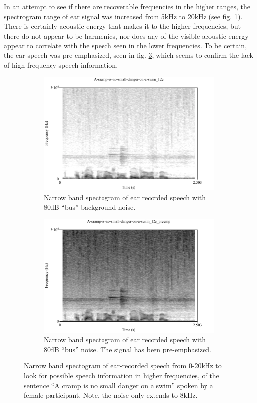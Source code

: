\documentclass[dissertation,copyright]{uathesis}
\begin{document}
In an attempt to see if there are recoverable frequencies in the higher ranges, the spectrogram range of ear signal was increased from 5kHz to 20kHz (see fig. \ref{spctgrmEarNarrow20kHz}). There is certainly acoustic energy that makes it to the higher frequencies, but there do not appear to be harmonics, nor does any of the visible acoustic energy appear to correlate with the speech seen in the lower frequencies.
To be certain, the ear speech was pre-emphasized, seen in fig. \ref{spctgrmNarrowEarNoisePremp_35}, which seems to confirm the lack of high-frequency speech information. 
\begin{figure}
\centering
\begin{subfigure}{0.475\textwidth}
  \centering
  \includegraphics[width=1\linewidth]{figure/spctgrmEarNarrow20kHz.pdf}
  \caption{Narrow band spectogram of ear recorded speech with 80dB ``bus'' background noise.}
  \label{spctgrmEarNarrow20kHz}
\end{subfigure}%
\hfill
\begin{subfigure}{0.475\textwidth}
  \centering
  \includegraphics[width=1\linewidth]{figure/spctgrmNarrowEarNoisePremp.pdf}
  \caption{Narrow band spectogram of ear recorded speech with 80dB ``bus'' noise.  The signal has been pre-emphasized.}
  \label{spctgrmNarrowEarNoisePremp_35}
\end{subfigure}
\caption{Narrow band spectogram of ear-recorded speech from 0-20kHz to look for possible speech information in higher frequencies, of the sentence ``A cramp is no small danger on a swim'' spoken by a female participant. Note, the noise only extends to 8kHz.}
\end{figure}
\end{document}
